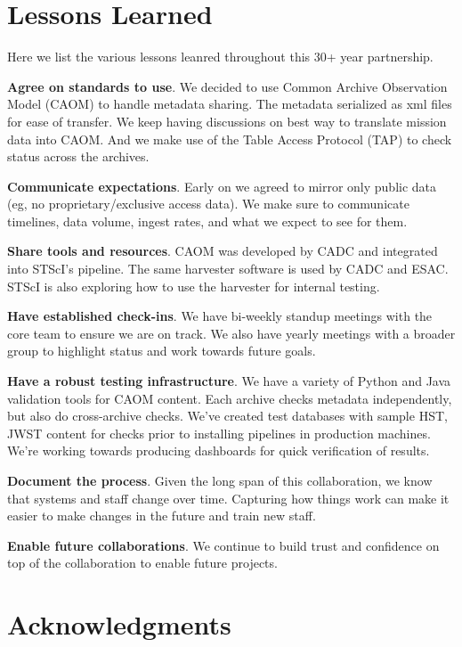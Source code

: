 \documentclass[11pt,twoside]{article}
\begin{document}
\section{Lessons Learned}

Here we list the various lessons leanred throughout this 30+ year partnership.

\textbf{Agree on standards to use}. 
We decided to use Common Archive Observation Model (CAOM) to handle metadata sharing. 
The metadata serialized as xml files for ease of transfer. 
We keep having discussions on best way to translate mission data into CAOM. 
And we make use of the Table Access Protocol (TAP) to check status across the archives.

\textbf{Communicate expectations}.
Early on we agreed to mirror only public data (eg, no proprietary/exclusive access data). 
We make sure to communicate timelines, data volume, ingest rates, and what we expect to see for them. 

\textbf{Share tools and resources}. 
CAOM was developed by CADC and integrated into STScI's pipeline.
The same harvester software is used by CADC and ESAC. 
STScI is also exploring how to use the harvester for internal testing.

\textbf{Have established check-ins}.
We have bi-weekly standup meetings with the core team to ensure we are on track. 
We also have yearly meetings with a broader group to highlight status and work towards future goals.

\textbf{Have a robust testing infrastructure}.
We have a variety of Python and Java validation tools for CAOM content. 
Each archive checks metadata independently, but also do cross-archive checks. 
We've created test databases with sample HST, JWST content for checks prior to installing pipelines in production machines.
We're working towards producing dashboards for quick verification of results.

\textbf{Document the process}.
Given the long span of this collaboration, we know that systems and staff change over time. 
Capturing how things work can make it easier to make changes in the future and train new staff.

\textbf{Enable future collaborations}.
We continue to build trust and confidence on top of the collaboration to enable future projects.

\section{Acknowledgments}
\end{document}
